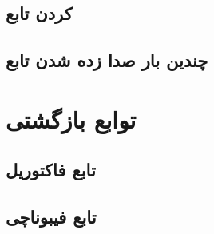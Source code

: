 \documentclass[11pt, dvipsnames, svgnames, x11names]{article}
\begin{document}
\subsection{ کردن تابع}

\subsection{چندین بار صدا زده شدن تابع}

\section{توابع بازگشتی}

\subsection{تابع فاکتوریل}

\subsection{تابع فیبوناچی}
\end{document}
